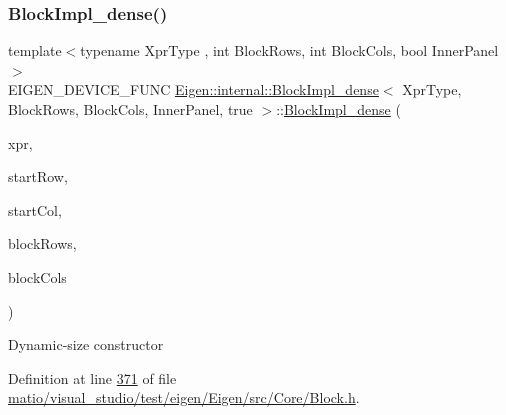 \mbox{\label{class_eigen_1_1internal_1_1_block_impl__dense_3_01_xpr_type_00_01_block_rows_00_01_block_cols_00_01_inner_panel_00_01true_01_4_a9e2d1e641a5000ca0c10b1eaeab84adf}} 
\subsubsection{\texorpdfstring{Block\+Impl\+\_\+dense()}{BlockImpl\_dense()}\hspace{0.1cm}{\footnotesize\ttfamily [6/6]}}
{\footnotesize\ttfamily template$<$typename Xpr\+Type , int Block\+Rows, int Block\+Cols, bool Inner\+Panel$>$ \\
E\+I\+G\+E\+N\+\_\+\+D\+E\+V\+I\+C\+E\+\_\+\+F\+U\+NC \hyperlink{class_eigen_1_1internal_1_1_block_impl__dense}{Eigen\+::internal\+::\+Block\+Impl\+\_\+dense}$<$ Xpr\+Type, Block\+Rows, Block\+Cols, Inner\+Panel, true $>$\+::\hyperlink{class_eigen_1_1internal_1_1_block_impl__dense}{Block\+Impl\+\_\+dense} (\begin{DoxyParamCaption}\item[{Xpr\+Type \&}]{xpr,  }\item[{\hyperlink{namespace_eigen_a62e77e0933482dafde8fe197d9a2cfde}{Index}}]{start\+Row,  }\item[{\hyperlink{namespace_eigen_a62e77e0933482dafde8fe197d9a2cfde}{Index}}]{start\+Col,  }\item[{\hyperlink{namespace_eigen_a62e77e0933482dafde8fe197d9a2cfde}{Index}}]{block\+Rows,  }\item[{\hyperlink{namespace_eigen_a62e77e0933482dafde8fe197d9a2cfde}{Index}}]{block\+Cols }\end{DoxyParamCaption})\hspace{0.3cm}{\ttfamily [inline]}}

Dynamic-\/size constructor 

Definition at line \hyperlink{matio_2visual__studio_2test_2eigen_2_eigen_2src_2_core_2_block_8h_source_l00371}{371} of file \hyperlink{matio_2visual__studio_2test_2eigen_2_eigen_2src_2_core_2_block_8h_source}{matio/visual\+\_\+studio/test/eigen/\+Eigen/src/\+Core/\+Block.\+h}.



